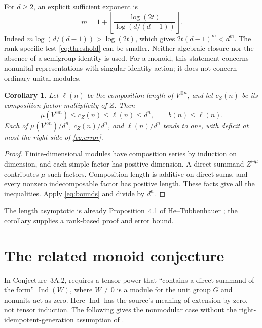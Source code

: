 \documentclass[11pt]{article}
\newtheorem{corollary}[theorem]{Corollary}
\begin{document}
For \(d\geq2\), an explicit sufficient exponent is
\[
 m=1+\left\lfloor\frac{\log(2t)}{\log(d/(d-1))}\right\rfloor.
\]
Indeed \(m\log(d/(d-1))>\log(2t)\), which gives
\(2t(d-1)^m<d^m\). The rank-specific test \eqref{eq:threshold} can be smaller.
Neither algebraic closure nor the absence of a semigroup identity is used.
For a monoid, this statement concerns nonunital representations with singular
identity action; it does not concern ordinary unital modules.

\begin{corollary}\label{cor:length}
Let \(\ell(n)\) be the composition length of \(V^{\otimes n}\), and let
\(c_Z(n)\) be its composition-factor multiplicity of \(Z\). Then
\[
 \mu(V^{\otimes n})\leq c_Z(n)\leq\ell(n)\leq d^n,
 \qquad b(n)\leq\ell(n).
\]
Each of \(\mu(V^{\otimes n})/d^n\), \(c_Z(n)/d^n\), and \(\ell(n)/d^n\)
tends to one, with deficit at most the right side of \eqref{eq:error}.
\end{corollary}
\begin{proof}
Finite-dimensional modules have composition series by induction on dimension,
and each simple factor has positive dimension. A direct summand \(Z^{\oplus\mu}\)
contributes \(\mu\) such factors. Composition length is additive on direct sums,
and every nonzero indecomposable factor has positive length. These facts give all
the inequalities. Apply \eqref{eq:bounds} and divide by \(d^n\).
\end{proof}
The length asymptotic is already Proposition~4.1 of He--Tubbenhauer
\cite[p.~17]{HT25}; the corollary supplies a rank-based proof and error bound.

\section{The related monoid conjecture}
In Conjecture~3A.2, \cite[p.~11]{HT25} requires a tensor power that
``contains a direct summand of the form'' \(\operatorname{Ind}(W)\), where
\(W\ne0\) is a module for the unit group \(G\) and nonunits act as zero.
Here \(\operatorname{Ind}\) has the source's meaning of extension by zero,
not tensor induction. The following gives the nonmodular case without the
right-idempotent-generation assumption of \cite[Theorem~4A.12(c)]{HT26}.
\end{document}
